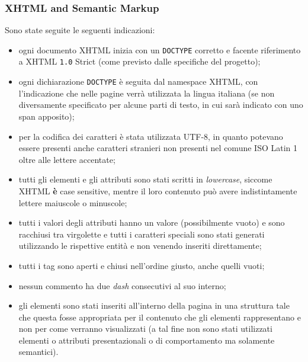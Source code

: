 \subsubsection{XHTML and Semantic Markup}
Sono state seguite le seguenti indicazioni:
\begin{itemize}
\item ogni documento XHTML inizia con un \texttt{DOCTYPE} corretto e facente
riferimento a XHTML \texttt{1.0} Strict (come previsto dalle specifiche del
progetto);
\item ogni dichiarazione \texttt{DOCTYPE} è seguita dal namespace XHTML, con
l'indicazione che nelle pagine verrà utilizzata la lingua italiana (se non
diversamente specificato per alcune parti di testo, in cui sarà indicato con
uno span apposito);
\item per la codifica dei caratteri è stata utilizzata UTF-8, in quanto
potevano essere presenti anche caratteri stranieri non presenti nel comune ISO
Latin 1 oltre alle lettere accentate;
\item tutti gli elementi e gli attributi sono stati scritti in
\textit{lowercase}, siccome XHTML \textbf{è} case sensitive, mentre il loro
contenuto può avere indistintamente lettere maiuscole o minuscole;
\item tutti i valori degli attributi hanno un valore (possibilmente vuoto) e
sono racchiusi tra virgolette e tutti i caratteri speciali sono stati generati
utilizzando le rispettive entità e non venendo inseriti direttamente;
\item tutti i tag sono aperti e chiusi nell'ordine giusto, anche quelli vuoti;
\item nessun commento ha due \textit{dash} consecutivi al suo interno;
\item gli elementi sono stati inseriti all'interno della pagina in una
struttura tale che questa fosse appropriata per il contenuto che gli elementi
rappresentano e non per come verranno visualizzati (a tal fine non sono stati
utilizzati elementi o  attributi presentazionali o di comportamento ma
solamente semantici).
\end{itemize}

